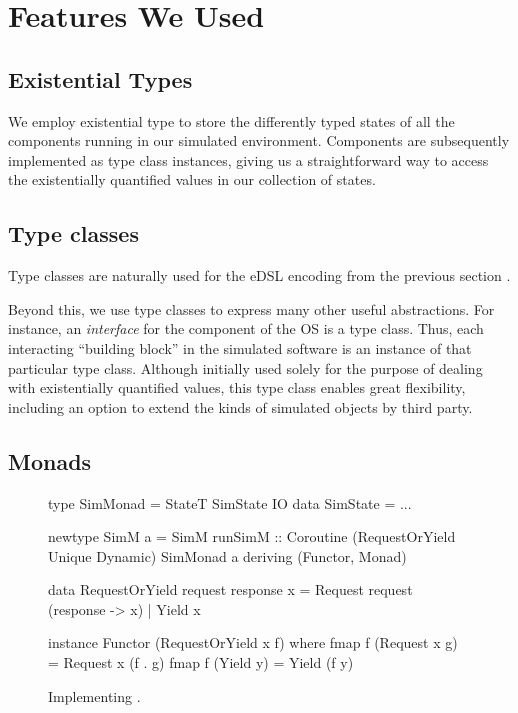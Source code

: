 \section{Features We Used}
\label{sec:impl-detail}

\subsection{Existential Types}
We employ existential type to store the differently typed states of all the components running in our simulated environment.
Components are subsequently implemented as type class instances, giving us a straightforward way to access the existentially quantified values in our collection of states.

\subsection{Type classes}
Type classes are naturally used for the eDSL encoding from the previous section \cite{Hall:1996:TCH:227699.227700,final_tagless_embedding}.

Beyond this, we use type classes to express many other useful abstractions.
For instance, an \emph{interface} for the component of the OS is a type class.
Thus, each interacting ``building block'' in the simulated software is an instance of that particular type class.
Although initially used solely for the purpose of dealing with existentially quantified values, this  type class enables great flexibility, including an option to extend the kinds of simulated objects by third party.

\subsection{Monads}
\label{sec:impl-monads}
\begin{figure}
\centering
\begin{code}
type SimMonad =  StateT SimState IO
data SimState = ...

newtype SimM a
  = SimM { runSimM :: Coroutine
      (RequestOrYield Unique Dynamic)
      SimMonad a }
    deriving (Functor, Monad)

data RequestOrYield request response x
  = Request request (response -> x)
  | Yield   x

instance Functor (RequestOrYield x f) where
  fmap f (Request x g) = Request x (f . g)
  fmap f (Yield y)     = Yield (f y)
\end{code}
\caption{Implementing .}
\label{fig:code-simm}
\end{figure}

